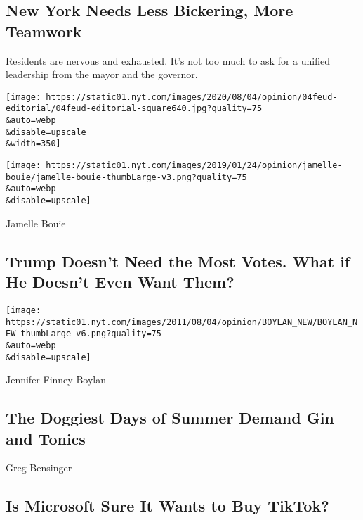 \hypertarget{new-york-needs-less-bickering-more-teamwork}{%
\subsection{New York Needs Less Bickering, More
Teamwork}\label{new-york-needs-less-bickering-more-teamwork}}

Residents are nervous and exhausted. It's not too much to ask for a
unified leadership from the mayor and the governor.

\href{/2020/08/04/opinion/cuomo-de-blasio-coronavirus-nyc.html}{}

\texttt{[image: https://static01.nyt.com/images/2020/08/04/opinion/04feud-editorial/04feud-editorial-square640.jpg?quality=75\\\&auto=webp\\\&disable=upscale\\\&width=350]}

\href{/2020/08/04/opinion/trump-2020-electoral-college.html}{}

\texttt{[image: https://static01.nyt.com/images/2019/01/24/opinion/jamelle-bouie/jamelle-bouie-thumbLarge-v3.png?quality=75\\\&auto=webp\\\&disable=upscale]}

Jamelle Bouie

\hypertarget{trump-doesnt-need-the-most-votes-what-if-he-doesnt-even-want-them}{%
\subsection{Trump Doesn't Need the Most Votes. What if He Doesn't Even
Want
Them?}\label{trump-doesnt-need-the-most-votes-what-if-he-doesnt-even-want-them}}

\href{/2020/08/04/opinion/gin-tonic-summer-drink.html}{}

\texttt{[image: https://static01.nyt.com/images/2011/08/04/opinion/BOYLAN\_NEW/BOYLAN\_NEW-thumbLarge-v6.png?quality=75\\\&auto=webp\\\&disable=upscale]}

Jennifer Finney Boylan

\hypertarget{the-doggiest-days-of-summer-demand-gin-and-tonics}{%
\subsection{The Doggiest Days of Summer Demand Gin and
Tonics}\label{the-doggiest-days-of-summer-demand-gin-and-tonics}}

\href{/2020/08/04/opinion/tiktok-microsoft-trump.html}{}

Greg Bensinger

\hypertarget{is-microsoft-sure-it-wants-to-buy-tiktok}{%
\subsection{Is Microsoft Sure It Wants to Buy
TikTok?}\label{is-microsoft-sure-it-wants-to-buy-tiktok}}

